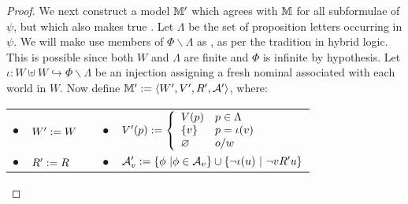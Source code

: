 \begin{proof}
    
    
  
  
  
  We next construct a model $\mathbbm{M}'$ which agrees with
  $\mathbbm{M}$ for all subformulae of $\psi$, but which also makes true
  .  Let $\Lambda$ be the set of proposition
  letters occurring in $\psi$.  We will make use members of $\Phi \backslash
  \Lambda$ as {}, as per the tradition in hybrid logic.  This
  is possible since both $W$ and $\Lambda$ are finite and $\Phi$ is infinite
  by hypothesis.  Let $\iota : W \uplus W \hookrightarrow \Phi \backslash
  \Lambda$ be an injection assigning a fresh nominal associated with each
  world in $W$.  Now define $\mathbbm{M}' \assign \langle W',
  V', R', \mathcal{A}' \rangle$, where:
  
  \begin{center}
    \begin{tabular}{lllll}
      $\bullet$ & $W' \assign W$ &  & $\bullet$ & $V' (p) \assign \left\{
      \begin{array}{ll}
        V (p) & p \in \Lambda\\
        \{v\} & p = \iota (v)\\
        \varnothing & o / w
      \end{array} \right.$\\
      $\bullet$ & $R' \assign R$ & {\hspace{3em}} & $\bullet$ &
      $\mathcal{A}'_v \assign \{\phi \  | \phi \in \mathcal{A}_v
      \} \cup \{\neg \iota (u) \  | \  \neg v R' u\}$
    \end{tabular}
  \end{center}
  

\end{proof}
